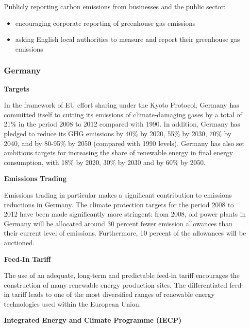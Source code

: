 Publicly reporting carbon emissions from businesses and the public sector:
\begin{itemize}
	\item encouraging corporate reporting of greenhouse gas emissions
	\item asking English local authorities to measure and report their greenhouse gas emissions
\end{itemize}



	\subsubsection{Germany}
	
	

\textbf{Targets}



In the framework of EU effort sharing under the Kyoto Protocol, Germany has committed itself to cutting its emissions of climate-damaging gases by a total of 21\% in the period 2008 to 2012 compared with 1990. 
In addition, Germany has pledged to reduce its GHG emissions by 40\% by 2020, 55\% by 2030, 70\% by 2040, and by 80-95\% by 2050 (compared with 1990 levels).  
Germany has also set ambitious targets for increasing the share of renewable energy in final energy consumption, with 18\% by 2020, 30\% by 2030 and by 60\% by 2050.



\textbf{Emissions Trading}



Emissions trading in particular makes a significant contribution to emissions reductions in Germany. 
The climate protection targets for the period 2008 to 2012 have been made significantly more stringent: from 2008, old power plants in Germany will be allocated around 30 percent fewer emission allowances than their current level of emissions. Furthermore, 10 percent of the allowances will be auctioned. 



\textbf{Feed-In Tariff}



The use of an adequate, long-term and predictable feed-in tariff encourages the construction of many renewable energy production sites. 
The differentiated feed-in tariff leads to one of the most diversified ranges of renewable energy technologies used within the European Union.



\textbf{Integrated Energy and Climate Programme (IECP)}



